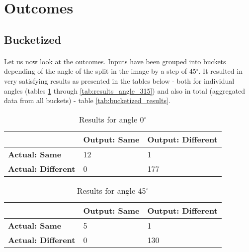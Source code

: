 \section{Outcomes}
\subsection{Bucketized}
\paragraph{}
Let us now look at the outcomes. Inputs have been grouped into buckets depending of the angle of the split in the image by a step of 45$^{\circ}$. It resulted in very satisfying results as presented in the tables below - both for individual angles (tables \ref{tab:results_angle_0} through \ref{tab:results_angle_315}) and also in total (aggregated data from all buckets) - table \ref{tab:bucketized_results}.

\begin{table}[H]
    \centering
	\begin{spacing}{1.5}    
    \begin{tabular}{|l|l|l|}
        \hline
        \cellcolor{gray} & \textbf{Output: Same} & \textbf{Output: Different} \\ [0.5ex]
        \hline\hline
        \textbf{Actual: Same} & 12 & 1 \\ [0.5ex]
        \hline
        \textbf{Actual: Different} & 0 & 177 \\ [0.5ex]
        \hline
    \end{tabular}
    \end{spacing}
    \caption{Results for angle 0$^{\circ}$}
    \label{tab:results_angle_0}
\end{table}
            
\begin{table}[H]
    \centering
	\begin{spacing}{1.5}    
    \begin{tabular}{|l|l|l|}
        \hline
        \cellcolor{gray} & \textbf{Output: Same} & \textbf{Output: Different} \\ [0.5ex]
        \hline\hline
        \textbf{Actual: Same} & 5 & 1 \\ [0.5ex]
        \hline
        \textbf{Actual: Different} & 0 & 130 \\ [0.5ex]
        \hline
    \end{tabular}
    \end{spacing}
    \caption{Results for angle 45$^{\circ}$}
\end{table}
            
